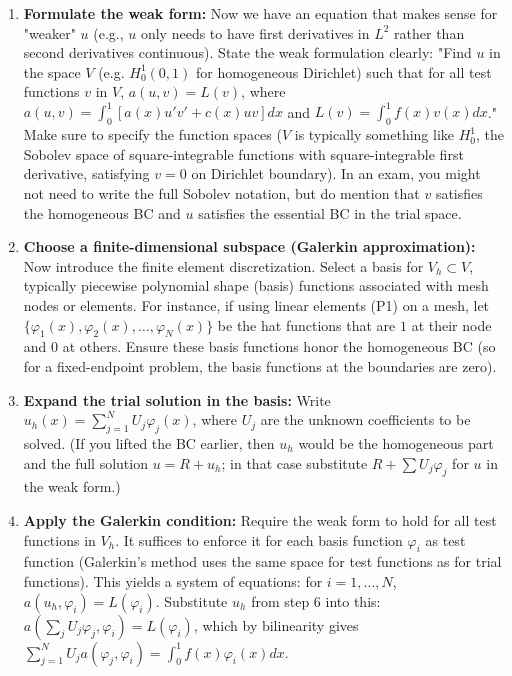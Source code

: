 \documentclass[a4paper,11pt]{article}
\begin{document}
\begin{enumerate}
    \item \textbf{Formulate the weak form:} Now we have an equation that makes sense for "weaker" $u$ (e.g., $u$ only needs to have first derivatives in $L^2$ rather than second derivatives continuous). State the weak formulation clearly: "Find $u$ in the space $V$ (e.g. $H_0^1(0,1)$ for homogeneous Dirichlet) such that for all test functions $v$ in $V$, $a(u,v)=L(v)$, where $a(u,v) = \int_0^1 [a(x) u' v' + c(x) u v]dx$ and $L(v) = \int_0^1 f(x)v(x)dx$." Make sure to specify the function spaces ($V$ is typically something like $H_0^1$, the Sobolev space of square-integrable functions with square-integrable first derivative, satisfying $v=0$ on Dirichlet boundary). In an exam, you might not need to write the full Sobolev notation, but do mention that $v$ satisfies the homogeneous BC and $u$ satisfies the essential BC in the trial space.

    \item \textbf{Choose a finite-dimensional subspace (Galerkin approximation):} Now introduce the finite element discretization. Select a basis for $V_h \subset V$, typically piecewise polynomial shape (basis) functions associated with mesh nodes or elements. For instance, if using linear elements (P1) on a mesh, let $\{\varphi_1(x), \varphi_2(x), \dots, \varphi_N(x)\}$ be the hat functions that are $1$ at their node and $0$ at others. Ensure these basis functions honor the homogeneous BC (so for a fixed-endpoint problem, the basis functions at the boundaries are zero).

    \item \textbf{Expand the trial solution in the basis:} Write $u_h(x) = \sum_{j=1}^N U_j\varphi_j(x)$, where $U_j$ are the unknown coefficients to be solved. (If you lifted the BC earlier, then $u_h$ would be the homogeneous part and the full solution $u = R + u_h$; in that case substitute $R+ \sum U_j \varphi_j$ for $u$ in the weak form.)

    \item \textbf{Apply the Galerkin condition:} Require the weak form to hold for all test functions in $V_h$. It suffices to enforce it for each basis function $\varphi_i$ as test function (Galerkin's method uses the same space for test functions as for trial functions). This yields a system of equations: for $i=1,\dots,N$, $a(u_h,\varphi_i)=L(\varphi_i)$. Substitute $u_h$ from step 6 into this: $a(\sum_j U_j \varphi_j, \varphi_i)=L(\varphi_i)$, which by bilinearity gives $\sum_{j=1}^N U_j a(\varphi_j,\varphi_i) = \int_0^1 f(x) \varphi_i(x) dx$.


\end{enumerate}
\end{document}
